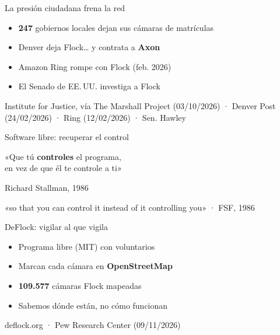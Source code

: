 \documentclass[aspectratio=169,12pt]{beamer}
\def\navprev{}
\def\navnext{}
\newcommand{\nav}[2]{\gdef\navprev{#1}\gdef\navnext{#2}}
\newcommand{\fuente}[1]{\vfill{\small\color{gris}#1\par}}
\begin{document}
\nav{Puerta trasera}{Stallman}
\begin{frame}{La presión ciudadana frena la red}
  \begin{itemize}
    \item \alert{\textbf{247}} gobiernos locales dejan sus cámaras de matrículas
    \item Denver deja Flock\ldots{} y contrata a \textbf{Axon}
    \item Amazon Ring rompe con Flock (feb. 2026)
    \item El Senado de EE.\,UU. investiga a Flock
  \end{itemize}
  \fuente{Institute for Justice, vía The Marshall Project (03/10/2026) · Denver Post (24/02/2026) · Ring (12/02/2026) · Sen. Hawley}
\end{frame}

\nav{Presión ciudadana}{DeFlock}
\begin{frame}{Software libre: recuperar el control}
  \vspace{0.8cm}
  \begin{center}
  {\fontsize{26}{34}\selectfont «Que tú \alert{\textbf{controles}} el programa,\\
   en vez de que él te controle a ti»\par}
  \vspace{0.5cm}
  {\Large\color{gris} Richard Stallman, 1986\par}
  \end{center}
  \fuente{«so that you can control it instead of it controlling you» · FSF, 1986}
\end{frame}

\nav{Stallman}{Frigate}
\begin{frame}{DeFlock: vigilar al que vigila}
  \begin{itemize}
    \item Programa libre (MIT) con voluntarios
    \item Marcan cada cámara en \textbf{OpenStreetMap}
    \item \alert{\textbf{109.577}} cámaras Flock mapeadas
    \item Sabemos dónde están, no cómo funcionan
  \end{itemize}
  \fuente{deflock.org · Pew Research Center (09/11/2026)}
\end{frame}
\end{document}
